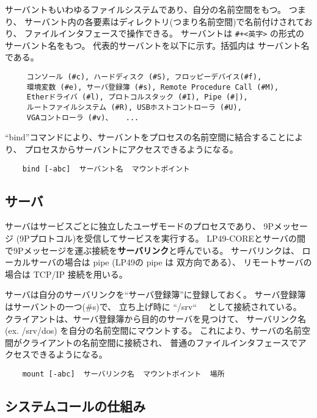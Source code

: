\documentclass{jarticle}
\begin{document}
  サーバントもいわゆるファイルシステムであり、自分の名前空間をもつ。
  つまり、
  サーバント内の各要素はディレクトリ(つまり名前空間)で名前付けされており、
  ファイルインタフェースで操作できる。
  サーバントは \verb|#+<英字>| の形式のサーバント名をもつ。
  代表的サーバントを以下に示す。括弧内は サーバント名である。

{\small
\begin{verbatim}
     コンソール (#c), ハードディスク (#S), フロッピーデバイス(#f), 
     環境変数 (#e), サーバ登録簿 (#s), Remote Procedure Call (#M), 
     Etherドライバ (#l), プロトコルスタック (#I), Pipe (#|), 
     ルートファイルシステム (#R), USBホストコントローラ (#U), 
     VGAコントローラ (#v)、   ...

\end{verbatim}
}

``bind''コマンドにより、サーバントをプロセスの名前空間に結合することにより、
プロセスからサーバントにアクセスできるようになる。

  \verb|    bind [-abc]  サーバント名  マウントポイント|  \\



\subsection{サーバ}

  サーバはサービスごとに独立したユーザモードのプロセスであり、
  9Pメッセージ (9Pプロトコル)を受信してサービスを実行する。
  LP49-COREとサーバの間で9Pメッセージを運ぶ接続を{\bf サーバリンク}と呼んでいる。
  サーバリンクは、
  ローカルサーバの場合は pipe (LP49の pipe は 双方向である）、
  リモートサーバの場合は TCP/IP 接続を用いる。

  サーバは自分のサーバリンクを``サーバ登録簿''に登録しておく。
  サーバ登録簿はサーバントの一つ(\#s)で、 立ち上げ時に ``/srv``
　として接続されている。
  クライアントは、サーバ登録簿から目的のサーバを見つけて、
  サーバリンク名(ex. /srv/dos) を自分の名前空間にマウントする。
  これにより、サーバの名前空間がクライアントの名前空間に接続され、
  普通のファイルインタフェースでアクセスできるようになる。

  \verb|    mount [-abc]  サーバリンク名  マウントポイント  場所 |  \\


\subsection{システムコールの仕組み}
\end{document}
